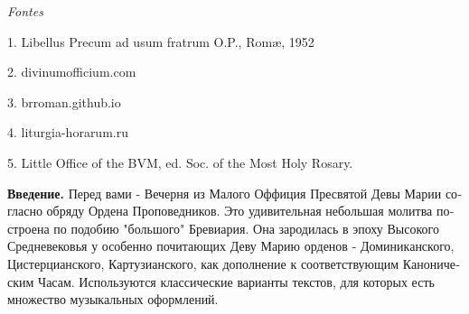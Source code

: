 \documentclass[14pt,a5paper]{extbook}
\newcommand{\officiumtitle}[1]{\parbox{\linewidth}{\centering\textit{#1}}}
\begin{document}
\begin{sloppy}
\begin{small}
\officiumtitle{Fontes}

1. Libellus Precum ad usum fratrum O.P., Romæ, 1952

2. divinumofficium.com

3. brroman.github.io

4. liturgia-horarum.ru

5. Little Office of the BVM, ed. Soc. of the Most Holy Rosary.

\end{small}

\pagebreak

\begin{russian}
\begin{small}

\textbf{Введение.} Перед вами - Вечерня из Малого Оффиция Пресвятой Девы Марии согласно обряду Ордена Проповедников. Это удивительная небольшая молитва построена по подобию "большого" Бревиария. Она зародилась в эпоху Высокого Средневековья у особенно почитающих Деву Марию орденов - Доминиканского, Цистерцианского, Картузианского, как дополнение к соответствующим Каноническим Часам.  
Используются классические варианты текстов, для которых есть множество музыкальных оформлений.


\end{small}
\end{russian}
\end{sloppy}
\end{document}
